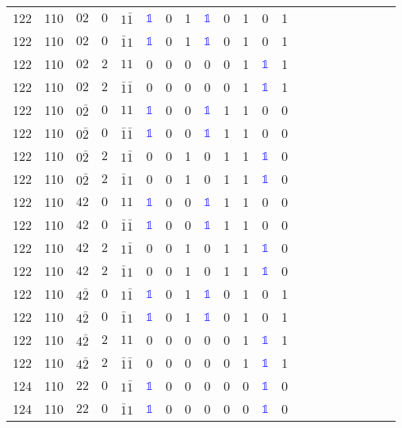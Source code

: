 \begin{longtable*}{c| cccccccccccccccccccc }
122& 110& $02$& $0$& $1\bar{1}$& \textcolor{blue}{$\mathds{1}$}& 0& 1& \textcolor{blue}{$\mathds{1}$}& 0& 1& 0& 1\\
122& 110& $02$& $0$& $\bar{1}1$& \textcolor{blue}{$\mathds{1}$}& 0& 1& \textcolor{blue}{$\mathds{1}$}& 0& 1& 0& 1\\
122& 110& $02$& $2$& $11$& 0& 0& 0& 0& 0& 1& \textcolor{blue}{$\mathds{1}$}& 1\\
122& 110& $02$& $2$& $\bar{1}\bar{1}$& 0& 0& 0& 0& 0& 1& \textcolor{blue}{$\mathds{1}$}& 1\\
122& 110& $0\bar{2}$& $0$& $11$& \textcolor{blue}{$\mathds{1}$}& 0& 0& \textcolor{blue}{$\mathds{1}$}& 1& 1& 0& 0\\
122& 110& $0\bar{2}$& $0$& $\bar{1}\bar{1}$& \textcolor{blue}{$\mathds{1}$}& 0& 0& \textcolor{blue}{$\mathds{1}$}& 1& 1& 0& 0\\
122& 110& $0\bar{2}$& $2$& $1\bar{1}$& 0& 0& 1& 0& 1& 1& \textcolor{blue}{$\mathds{1}$}& 0\\
122& 110& $0\bar{2}$& $2$& $\bar{1}1$& 0& 0& 1& 0& 1& 1& \textcolor{blue}{$\mathds{1}$}& 0\\
122& 110& $42$& $0$& $11$& \textcolor{blue}{$\mathds{1}$}& 0& 0& \textcolor{blue}{$\mathds{1}$}& 1& 1& 0& 0\\
122& 110& $42$& $0$& $\bar{1}\bar{1}$& \textcolor{blue}{$\mathds{1}$}& 0& 0& \textcolor{blue}{$\mathds{1}$}& 1& 1& 0& 0\\
122& 110& $42$& $2$& $1\bar{1}$& 0& 0& 1& 0& 1& 1& \textcolor{blue}{$\mathds{1}$}& 0\\
122& 110& $42$& $2$& $\bar{1}1$& 0& 0& 1& 0& 1& 1& \textcolor{blue}{$\mathds{1}$}& 0\\
122& 110& $4\bar{2}$& $0$& $1\bar{1}$& \textcolor{blue}{$\mathds{1}$}& 0& 1& \textcolor{blue}{$\mathds{1}$}& 0& 1& 0& 1\\
122& 110& $4\bar{2}$& $0$& $\bar{1}1$& \textcolor{blue}{$\mathds{1}$}& 0& 1& \textcolor{blue}{$\mathds{1}$}& 0& 1& 0& 1\\
122& 110& $4\bar{2}$& $2$& $11$& 0& 0& 0& 0& 0& 1& \textcolor{blue}{$\mathds{1}$}& 1\\
122& 110& $4\bar{2}$& $2$& $\bar{1}\bar{1}$& 0& 0& 0& 0& 0& 1& \textcolor{blue}{$\mathds{1}$}& 1\\
124& 110& $22$& $0$& $1\bar{1}$& \textcolor{blue}{$\mathds{1}$}& 0& 0& 0& 0& 0& \textcolor{blue}{$\mathds{1}$}& 0\\
124& 110& $22$& $0$& $\bar{1}1$& \textcolor{blue}{$\mathds{1}$}& 0& 0& 0& 0& 0& \textcolor{blue}{$\mathds{1}$}& 0\\

\end{longtable*}
